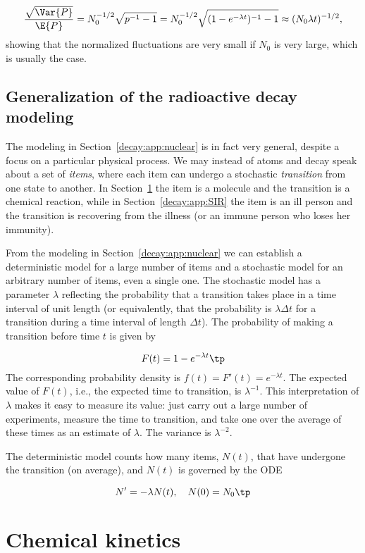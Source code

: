\documentclass[graybox,sectrefs,envcountresetchap,open=right,final]{svmonodo}
\begin{document}
\[ \frac{\sqrt{\Var{P}}}{\E{P}} = N_0^{-1/2}\sqrt{p^{-1}-1}
= N_0^{-1/2}\sqrt{(1-e^{-\lambda t})^{-1}-1}\approx
(N_0\lambda t)^{-1/2},
\]
showing that the normalized fluctuations are very small if $N_0$ is
very large, which is usually the case.

\subsection{Generalization of the radioactive decay modeling}
\label{decay:app:waitingtime}

The modeling in Section~\ref{decay:app:nuclear} is in fact very
general, despite a focus on a particular physical process. We may
instead of atoms and decay speak about a set of \emph{items}, where each
item can undergo a stochastic \emph{transition} from one state to
another. In Section~\ref{decay:app:kinetics} the item is a molecule and
the transition is a chemical reaction, while in Section~\ref{decay:app:SIR} the item is an ill person and the transition is
recovering from the illness (or an immune person who loses her
immunity).

From the modeling in Section~\ref{decay:app:nuclear} we can establish
a deterministic model for a large number of items and a stochastic
model for an arbitrary number of items, even a single one.
The stochastic model has a parameter $\lambda$ reflecting the
probability that a transition takes place in a time interval of
unit length (or equivalently, that the probability is $\lambda\Delta t$
for a transition during a time interval of length $\Delta t$).
The probability of making a transition before time $t$ is given by

\[ F(t) = 1- e^{-\lambda t}\tp\]
The corresponding probability density is $f(t)=F'(t)=e^{-\lambda t}$.
The expected value of $F(t)$, i.e., the expected time to transition,
is $\lambda^{-1}$. This interpretation of $\lambda$ makes it easy to
measure its value: just carry out a large number of experiments,
measure the time to transition, and take one over the average of these times as
an estimate of $\lambda$.
The variance is $\lambda^{-2}$.

The deterministic model counts how many items, $N(t)$, that have
undergone the transition (on average), and $N(t)$ is governed by the ODE

\[ N^{\prime} = -\lambda N(t),\quad N(0)=N_0\tp\]


\section{Chemical kinetics}
\label{decay:app:kinetics}
\end{document}
